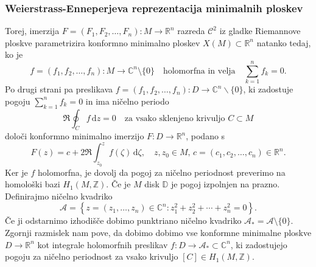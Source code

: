 \documentclass[8pt]{beamer}
\theoremstyle{definition}
\theoremstyle{remark}
\theoremstyle{plain}
\numberwithin{equation}{section}  %
\begin{document}
\begin{frame}
    \frametitle{Weierstrass-Enneperjeva reprezentacija minimalnih ploskev}

    Torej, imerzija $F=\left(F_1, F_2, \ldots, F_n\right): M \rightarrow \mathbb{R}^n$ razreda $\mathscr{C}^2$ iz gladke Riemannove ploskve parametrizira konformno minimalno ploskev $X(M) \subset \mathbb{R}^n$ natanko tedaj, ko je 
    \begin{equation*}
        f=\left(f_1, f_2, \ldots, f_n\right): M \rightarrow \mathbb{C}^n \setminus \{0\} \quad \text{holomorfna in velja} \quad  \sum_{k=1}^n f_k=0.
    \end{equation*}
    Po drugi strani pa preslikava $f=\left(f_1, f_2, \ldots, f_n\right): D \rightarrow \mathbb{C}^n \backslash\{0\}$, ki zadostuje pogoju $\sum_{k=1}^nf_k=0$ in ima ničelno periodo
    \begin{equation*}
        \Re \oint_C f \, \mathrm{d} z=0 \quad \text{za vsako sklenjeno krivuljo } C \subset M
    \end{equation*}
    določi konformno minimalno imerzijo $F: D \rightarrow \mathbb{R}^n$, podano s 
    \begin{equation*}
        F(z)=c+2 \Re \int_{z_0}^z f(\zeta) \, \mathrm{d} \zeta, \quad z, z_0 \in M, \, c=\left(c_1, c_2, \ldots, c_n\right) \in \mathbb{R}^n.
    \end{equation*}
    Ker je $f$ holomorfna, je dovolj da pogoj za ničelno periodnost preverimo na homološki bazi $H_1(M, \mathbb{Z})$. Če je $M$ disk $\mathbb{D}$ je pogoj izpolnjen na prazno. Definirajmo ničelno kvadriko 
    \begin{equation*}
        \mathcal{A}=\left\{z=\left(z_1, \ldots, z_n\right) \in \mathbb{C}^n: z_1^2+z_2^2+\cdots+z_n^2=0\right\}.    
    \end{equation*}
    Če ji odstarnimo izhodišče dobimo punktriano ničelno kvadriko $\mathcal{A}_*=\mathcal{A} \setminus \{0\}$. Zgornji razmislek nam pove, da dobimo dobimo vse konformne minimalne ploskve $D \rightarrow \mathbb{R}^n$ kot integrale holomorfnih preslikav $f: D \rightarrow \mathcal{A}_* \subset \mathbb{C}^n$, ki zadostujejo pogoju za ničelno periodnost za vsako krivuljo $[C] \in H_1(M, \mathbb{Z})$.

\end{frame}
\end{document}
